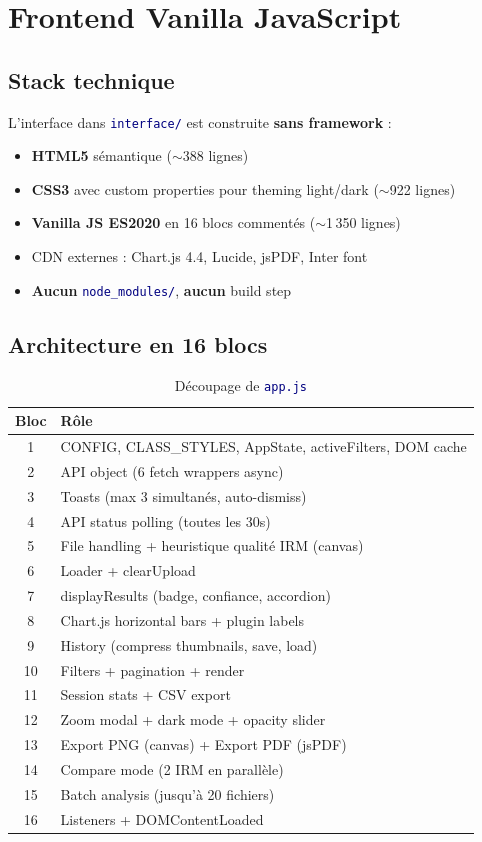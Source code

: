 \documentclass[11pt,a4paper,oneside]{report}
\newcommand{\code}[1]{\texttt{\textcolor{navy}{#1}}}
\begin{document}
\section{Frontend Vanilla JavaScript}

\subsection{Stack technique}

L'interface dans \code{interface/} est construite \textbf{sans framework} :

\begin{itemize}
\item \textbf{HTML5} sémantique ($\sim$388 lignes)
\item \textbf{CSS3} avec custom properties pour theming light/dark ($\sim$922 lignes)
\item \textbf{Vanilla JS ES2020} en 16 blocs commentés ($\sim$1\,350 lignes)
\item CDN externes : Chart.js 4.4, Lucide, jsPDF, Inter font
\item \textbf{Aucun} \code{node\_modules/}, \textbf{aucun} build step
\end{itemize}

\subsection{Architecture en 16 blocs}

\begin{table}[!htbp]
\centering
\caption{Découpage de \code{app.js}}
\small
\begin{tabular}{|c|l|}
\hline
\textbf{Bloc} & \textbf{Rôle} \\
\hline
1 & CONFIG, CLASS\_STYLES, AppState, activeFilters, DOM cache \\
2 & API object (6 fetch wrappers async) \\
3 & Toasts (max 3 simultanés, auto-dismiss) \\
4 & API status polling (toutes les 30s) \\
5 & File handling + heuristique qualité IRM (canvas) \\
6 & Loader + clearUpload \\
7 & displayResults (badge, confiance, accordion) \\
8 & Chart.js horizontal bars + plugin labels \\
9 & History (compress thumbnails, save, load) \\
10 & Filters + pagination + render \\
11 & Session stats + CSV export \\
12 & Zoom modal + dark mode + opacity slider \\
13 & Export PNG (canvas) + Export PDF (jsPDF) \\
14 & Compare mode (2 IRM en parallèle) \\
15 & Batch analysis (jusqu'à 20 fichiers) \\
16 & Listeners + DOMContentLoaded \\
\hline
\end{tabular}
\end{table}
\end{document}
